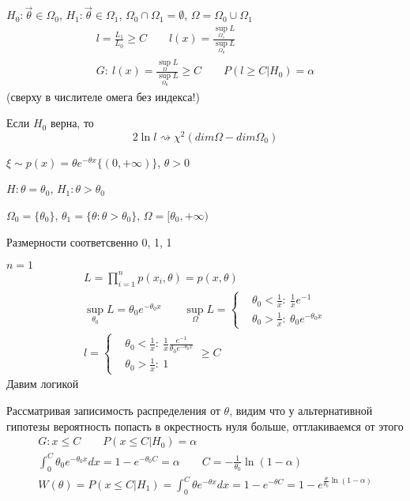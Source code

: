 \documentclass{article}
\begin{document}
$H_0: \vec{\theta} \in \Omega_{0}$, $H_1: \vec{\theta} \in \Omega_{1}$, $\Omega_0 \cap \Omega_1 = \emptyset$, $\Omega=\Omega_0 \cup \Omega_1$
\begin{gather*}
  l=\frac{L_1}{L_0} \ge C \qquad l(x)=\frac{\sup_{\Omega_1}L}{\sup_{\Omega_0}L} \\ 
  G: \ l(x)=\frac{\sup_{\Omega}L}{\sup_{\Omega_0}L} \ge C \qquad P(l \ge C|H_0)=\alpha
\end{gather*}
(сверху в числителе омега без индекса!)
\begin{theorem}
  Если $H_0$ верна, то
  \[
    2\ln l \rightsquigarrow \chi^{2}(dim\Omega - dim \Omega_0)
  \]
\end{theorem}
\begin{eg}
  $\xi \sim p(x)=\theta e^{-\theta x}\{(0, +\infty)\}$, $\theta > 0$

  $H:\theta=\theta_0$, $H_1:\theta>\theta_0$

  $\Omega_0=\{\theta_0\}$, $\theta_1=\{\theta:\theta>\theta_0\}$, $\Omega=[\theta_0, +\infty)$
  
  Размерности соответсвенно 0, 1, 1

  \hr 
  \underline{$n=1$}
  \begin{gather*}
    L=\prod_{i=1}^{n}p(x_i,\theta)=p(x,\theta) \\ 
    \sup_{\theta_0}L=\theta_0e^{-\theta_0 x} \qquad \sup_{\Omega} L = \left\{\begin{aligned}
      & \theta_0 < \frac{1}{x}: \  \frac{1}{x}e^{-1} \\ 
      & \theta_0 > \frac{1}{x}: \ \theta_0 e^{-\theta_0 x}
    \end{aligned}\right. \\ 
    l=\left\{\begin{aligned}
      & \theta_0 < \frac{1}{x}: \  \frac{1}{x}\frac{e^{-1}}{\theta_0 e^{-\theta_0 x}} \\
      & \theta_0 > \frac{1}{x}: \ 1
    \end{aligned}\right. \ge C
  \end{gather*}
  \hr 
  Давим логикой

  Рассматривая записимость распределения от $\theta$, видим что у альтернативной гипотезы
  вероятность попасть в окрестность нуля больше, оттлакиваемся от этого
  \begin{gather*}
    G: x \le C \qquad P(x \le C | H_0) =\alpha \\ 
    \int_{0}^{C}\theta_0 e^{-\theta_0 x}dx = 1 - e^{-\theta_0 C}=\alpha \qquad C=-\frac{1}{\theta_0}\ln (1-\alpha) \\ 
    W(\theta)=P(x \le C | H_1) = \int_{0}^{C}\theta e^{-\theta x}dx =1-e^{-\theta C} 
    =1-e^{\frac{\theta}{\theta_0}\ln(1-\alpha)}
  \end{gather*}


\end{eg}
\end{document}
